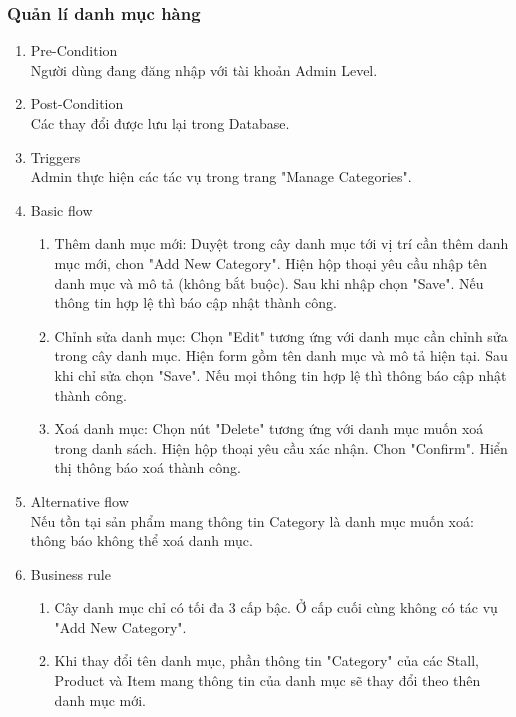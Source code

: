 \subsubsection{Quản lí danh mục hàng}
\begin{enumerate}
	\item Pre-Condition\\
	Người dùng đang đăng nhập với tài khoản Admin Level.
	\item Post-Condition\\
	Các thay đổi được lưu lại trong Database.
	\item Triggers\\
	Admin thực hiện các tác vụ trong trang "Manage Categories".
	\item Basic flow
	\begin{enumerate}
		\item Thêm danh mục mới: Duyệt trong cây danh mục tới vị trí cần thêm danh mục mới, chon "Add New Category". Hiện hộp thoại yêu cầu nhập tên danh mục và mô tả (không bắt buộc). Sau khi nhập chọn "Save". Nếu thông tin hợp lệ thì báo cập nhật thành công.
		\item Chỉnh sửa danh mục: Chọn "Edit" tương ứng với danh mục cần chỉnh sửa trong cây danh mục. Hiện form gồm tên danh mục và mô tả hiện tại. Sau khi chỉ sửa chọn "Save". Nếu mọi thông tin hợp lệ thì thông báo cập nhật thành công.
		\item Xoá danh mục: Chọn nút "Delete" tương ứng với danh mục muốn xoá trong danh sách. Hiện hộp thoại yêu cầu xác nhận. Chon "Confirm". Hiển thị thông báo xoá thành công.
	\end{enumerate}
	\item Alternative flow\\ 
	Nếu tồn tại sản phẩm mang thông tin Category là danh mục muốn xoá: thông báo không thể xoá danh mục.
	\item Business rule
	\begin{enumerate}
		\item Cây danh mục chỉ có tối đa 3 cấp bậc. Ở cấp cuối cùng không có tác vụ "Add New Category".
		\item Khi thay đổi tên danh mục, phần thông tin "Category" của các Stall, Product và Item mang thông tin của danh mục sẽ thay đổi theo thên danh mục mới.
	\end{enumerate}
\end{enumerate}


